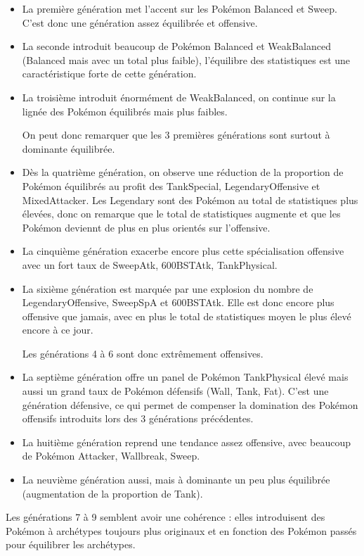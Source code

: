 \documentclass[a4paper,12pt]{article}
\begin{document}
\begin{itemize}
    \item La première génération met l'accent sur les Pokémon Balanced et Sweep.
    C'est donc une génération assez équilibrée et offensive.
    \item La seconde introduit beaucoup de Pokémon Balanced et WeakBalanced
    (Balanced mais avec un total plus faible), l'équilibre des statistiques est
    une caractéristique forte de cette génération.
    \item La troisième introduit énormément de WeakBalanced, on continue sur la
    lignée des Pokémon équilibrés mais plus faibles.
    
On peut donc remarquer que les 3 premières générations sont surtout à dominante
équilibrée.
    \item Dès la quatrième génération, on observe une réduction de la proportion
    de Pokémon équilibrés au profit des TankSpecial, LegendaryOffensive et
    MixedAttacker. Les Legendary sont des Pokémon au total de statistiques plus
    élevées, donc on remarque que le total de statistiques augmente et que les
    Pokémon deviennt de plus en plus orientés sur l'offensive.
    \item La cinquième génération exacerbe encore plus cette spécialisation
    offensive avec un fort taux de SweepAtk, 600BSTAtk, TankPhysical.
    \item La sixième génération est marquée par une explosion du nombre de
    LegendaryOffensive, SweepSpA et 600BSTAtk. Elle est donc encore plus
    offensive que jamais, avec en plus le total de statistiques moyen le plus
    élevé encore à ce jour.

Les générations 4 à 6 sont donc extrêmement offensives.
    \item La septième génération offre un panel de Pokémon TankPhysical élevé
    mais aussi un grand taux de Pokémon défensifs (Wall, Tank, Fat). C'est une
    génération défensive, ce qui permet de compenser la domination des Pokémon
    offensifs introduits lors des 3 générations précédentes.
    \item La huitième génération reprend une tendance assez offensive, avec
    beaucoup de Pokémon Attacker, Wallbreak, Sweep.
    \item La neuvième génération aussi, mais à dominante un peu plus équilibrée
    (augmentation de la proportion de Tank).
\end{itemize}

Les générations 7 à 9 semblent avoir une cohérence : elles introduisent des
Pokémon à archétypes toujours plus originaux et en fonction des Pokémon passés
pour équilibrer les archétypes.
\end{document}
